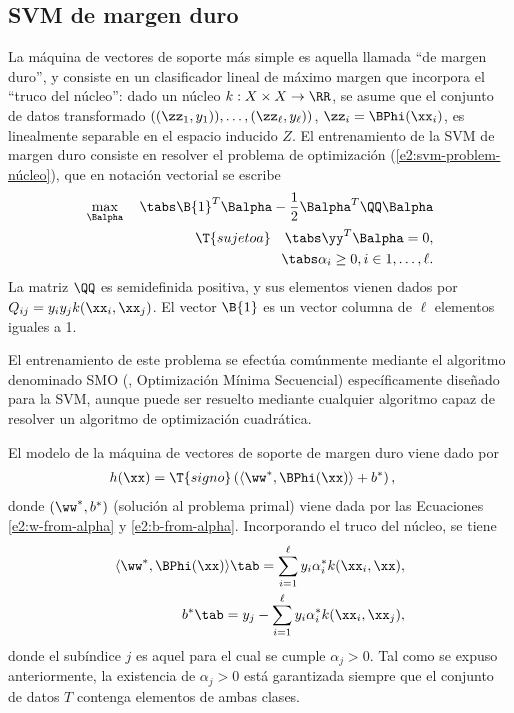 %
%
\subsection{SVM de margen duro}
%
La máquina de vectores de soporte más simple es aquella llamada ``de
margen duro'', y consiste en un clasificador lineal de máximo margen
que incorpora el ``truco del núcleo'': dado un núcleo
$k:X\times{}X\rightarrow\RR$, se asume que el conjunto de datos
transformado $\left((\zz_1,y_1)),\ldots,(\zz_\ell,y_\ell)\right)$,
$\zz_i=\BPhi(\xx_i)$, es linealmente separable en el espacio inducido
$Z$. El entrenamiento de la SVM de margen duro consiste en resolver el
problema de optimización (\ref{e2:svm-problem-núcleo}), que en
notación vectorial se escribe
%
\begin{align}
  \label{e2:svm-hard-margin}
  \begin{split}
    \max_{\Balpha}\quad\tabs
      \B{1}^T\Balpha-\frac{1}{2}\Balpha^T\QQ\Balpha\\
    \T{sujeto a} \quad\tabs
      \yy^T\Balpha = 0, \\
      \tabs \alpha_i\geq 0,  i\in {1,\ldots,\ell }.
  \end{split}
\end{align}
%
La matriz $\QQ$ es semidefinida positiva, y sus elementos vienen dados
por $Q_{ij}=y_iy_jk(\xx_i,\xx_j)$. El vector $\B{1}$ es un vector
columna de $\ell$ elementos iguales a 1.

El entrenamiento de este problema se efectúa comúnmente mediante el
algoritmo denominado SMO (,
Optimización Mínima Secuencial) \cite{smo} específicamente diseñado
para la SVM, aunque puede ser resuelto mediante cualquier algoritmo
capaz de resolver un algoritmo de optimización cuadrática.

El modelo de la máquina de vectores de soporte de margen
duro viene dado por
%
\begin{align}
  \begin{split}
    h(\xx) &= \T{signo}\left(\langle\ww^*,\BPhi(\xx)\rangle+b^*\right),
  \end{split}
\label{e2:svm-model-hard0}
\end{align}
%
donde $(\ww^*,b^*)$ (solución al problema primal)
viene dada por las Ecuaciones \ref{e2:w-from-alpha} y \ref{e2:b-from-alpha}.
Incorporando el truco del núcleo, se tiene
%
\begin{align}
    \langle\ww^*,\BPhi(\xx)\rangle \tab= \sum_{i=1}^\ell{}y_i\alpha^*_ik(\xx_i,\xx),\\
    b^* \tab= y_j - \sum_{i=1}^\ell{}y_i\alpha^*_ik(\xx_i,\xx_j),
\end{align}
%
donde el subíndice $j$ es aquel para el cual se cumple $\alpha_j>0$.
Tal como se expuso anteriormente, la existencia de $\alpha_j>0$ está
garantizada siempre que el conjunto de datos $T$ contenga elementos de
ambas clases.
